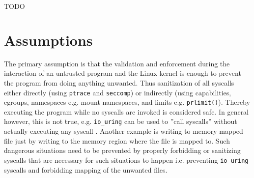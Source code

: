 \documentclass[en]{pracamgr}
\begin{document}




\iffalse
TODO

\section{Assumptions}

The primary assumption is that the validation and enforcement during the interaction of an untrusted program and the Linux kernel is enough to prevent the program from doing anything unwanted. Thus sanitization of all syscalls either directly (using \texttt{ptrace} and \texttt{seccomp}) or indirectly (using capabilities, cgroups, namespaces e.g. mount namespaces, and limits e.g. \texttt{prlimit()}). Thereby executing the program while no syscalls are invoked is considered safe. In general however, this is not true, e.g. \texttt{io\_uring} can be used to ''call syscalls'' without actually executing any syscall \cite{io_uring_paper, io_uring_kernel_recipes, lwn_io_uring, lwn_io_uring_2}. Another example is writing to memory mapped file just by writing to the memory region where the file is mapped to. Such dangerous situations need to be prevented by properly forbidding or sanitizing syscalls that are necessary for such situations to happen i.e. preventing \texttt{io\_uring} syscalls and forbidding mapping of the unwanted files.

\end{document}
